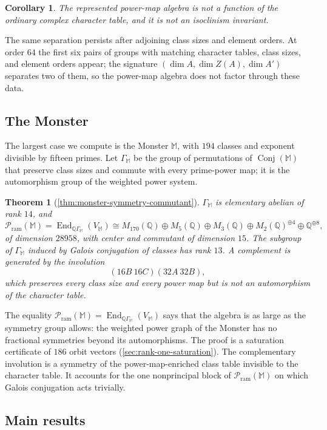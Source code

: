 \documentclass[11pt,reqno]{amsart}
\numberwithin{equation}{section}
\newtheorem{corollary}[corollary]{Corollary}
\theoremstyle{remark}
\theoremstyle{plain}
\newtheorem{thmintro}{Theorem}
\newcommand{\Q}{\mathbb Q}
\newcommand{\M}{\mathbb M}
\newcommand{\Pram}{\mathcal P_{\mathrm{ram}}}
\newcommand{\End}{\operatorname{End}}
\newcommand{\Conj}{\operatorname{Conj}}
\newcommand{\1}{\mathbf 1}
\begin{document}
\begin{corollary}
\label{cor:strict-refinement}
The represented power-map algebra is not a function of the ordinary
complex character table, and it is not an isoclinism invariant.
\end{corollary}

The same separation persists after adjoining class sizes and element
orders.  At order \(64\) the first six pairs of groups with matching
character tables, class sizes, and element orders appear; the signature
\((\dim A,\dim Z(A),\dim A')\) separates two of them, so the
power-map algebra does not factor through these data.

\subsection{The Monster}

The largest case we compute is the Monster \(\M\), with \(194\) classes
and exponent divisible by fifteen primes.  Let \(\Gamma_{\M}\) be the group
of permutations of \(\Conj(\M)\) that preserve class sizes and commute
with every prime-power map; it is the automorphism group of the weighted
power system.

\begin{thmintro}[\cref{thm:monster-symmetry-commutant}]
\label{thm:intro-monster}
\(\Gamma_{\M}\) is elementary abelian of rank \(14\), and
\[
 \Pram(\M)
 =\End_{\Q\Gamma_{\M}}(V_{\M})
 \cong
 M_{170}(\Q)\oplus M_5(\Q)\oplus M_3(\Q)
 \oplus M_2(\Q)^{\oplus4}\oplus\Q^{\oplus8},
\]
of dimension \(28958\), with center and commutant of dimension \(15\).
The subgroup of \(\Gamma_{\M}\) induced by Galois conjugation of classes
has rank \(13\).  A complement is generated by the involution
\[
 (16B\ 16C)(32A\ 32B),
\]
which preserves every class size and every power map but is not an
automorphism of the character table.
\end{thmintro}

The equality \(\Pram(\M)=\End_{\Q\Gamma_{\M}}(V_{\M})\) says that the
algebra is as large as the symmetry group allows: the weighted power graph
of the Monster has no fractional symmetries beyond its automorphisms.  The
proof is a saturation certificate of \(186\) orbit vectors
(\cref{sec:rank-one-saturation}).  The complementary involution is a
symmetry of the power-map-enriched class table invisible to the character
table.  It accounts for the one nonprincipal block of \(\Pram(\M)\) on
which Galois conjugation acts trivially.

\subsection{Main results}
\end{document}
